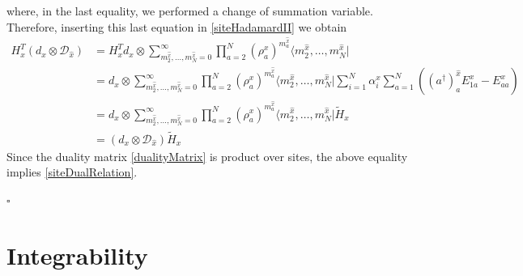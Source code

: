 \documentclass[11pt]{article}
\numberwithin{equation}{section}
\numberwithin{equation}{subsection}
\newcommand{\dd}{\mathcal{D}_{\widehat{x}}}
\begin{document}
where, in the last equality, we performed a change of summation variable. Therefore, inserting this last equation in \eqref{siteHadamardII} we obtain 
\begin{equation}
    \begin{split}
H_{x}^{T}\left(d_{x}\otimes \dd\right)&=
     H_{x}^{T}d_{x}\otimes \sum_{m_{2}^{\widehat{x}},\ldots,m_{N}^{\widehat{x}}=0}^{\infty}\prod_{a=2}^{N}\left(\rho_{a}^{x}\right)^{m_{a}^{\widehat{x}}}\langle m_{2}^{\widehat{x}},\ldots,m_{N}^{\widehat{x}}|
\\&=
d_{x}\otimes \sum_{m_{2}^{\widehat{x}},\ldots,m_{N}^{\widehat{x}}=0}^{\infty}\prod_{a=2}^{N}\left(\rho_{a}^{x}\right)^{m_{a}^{\widehat{x}}}\langle m_{2}^{\widehat{x}},\ldots,m_{N}^{\widehat{x}}|\sum_{i=1}^{N}\alpha_{i}^{x}\sum_{a=1}^{N}\left((a^{\dagger})_{a}^{\widehat{x}}E_{1a}^{x}-E_{aa}^{x}\right)   
\\&=
d_{x}\otimes \sum_{m_{2}^{\widehat{x}},\ldots,m_{N}^{\widehat{x}}=0}^{\infty}\prod_{a=2}^{N}\left(\rho_{a}^{x}\right)^{m_{a}^{\widehat{x}}}\langle m_{2}^{\widehat{x}},\ldots,m_{N}^{\widehat{x}}|\widetilde{H}_{x}
\\&=
\left(d_{x}\otimes \dd\right)\widetilde{H}_{x}
    \end{split}
\end{equation}
Since the duality matrix \eqref{dualityMatrix} is product over sites, the above equality implies \eqref{siteDualRelation}. 
\begin{flushright}
$\square$
\end{flushright}









\section{Integrability}\label{sectionIntegrabiliy}
\end{document}
